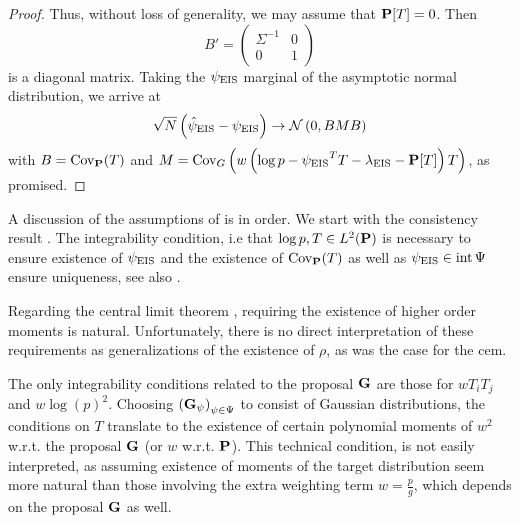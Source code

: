 \begin{proof}
    Thus, without loss of generality, we may assume that $\P[T] = 0$. 
    Then 
    $$
        B' = \begin{pmatrix}
            \Sigma^{-1} & 0 \\
            0 & 1
        \end{pmatrix}
    $$
    is a diagonal matrix. Taking the $\peis$ marginal of the asymptotic normal distribution, we arrive at 
    $$
        \sqrt{N} \left( \hpeis - \peis \right) \to \mathcal N \left( 0, BMB \right)
    $$
    with $B = \cov_{\P}(T)$ and $M = \cov_{G} \left( w \left( \log p - \peis^{T}T - \lambda_{\eis} - \P[T] \right)T \right)$, as promised.
    
\end{proof}


A discussion of the assumptions of  is in order. We start with the consistency result . The integrability condition, i.e that $\log p, T \in L^{2}(\P)$ is necessary to ensure existence of $\peis$ and the existence of $\cov_{\P}(T)$ as well as $\peis \in \operatorname{int} \Psi$ ensure uniqueness, see also . 

Regarding the central limit theorem , requiring the existence of higher order moments is natural. Unfortunately, there is no direct interpretation of these requirements as generalizations of the existence of $\rho$, as was the case for the \acrshort{cem}. 

The only integrability conditions related to the proposal $\G$ are those for $wT_{i}T_{j}$ and $w \log(p)^{2}$. 
Choosing $\left(\G_{\psi}\right)_{\psi \in \Psi}$ to consist of Gaussian distributions, the conditions on $T$ translate to the existence of certain polynomial moments of $w^{2}$ w.r.t. the proposal $\G$ (or $w$ w.r.t. $\P$). This technical condition, is not easily interpreted, as assuming existence of moments of the target distribution seem more natural than those involving the extra weighting term $w = \frac{p}{g}$, which depends on the proposal $\G$ as well. 